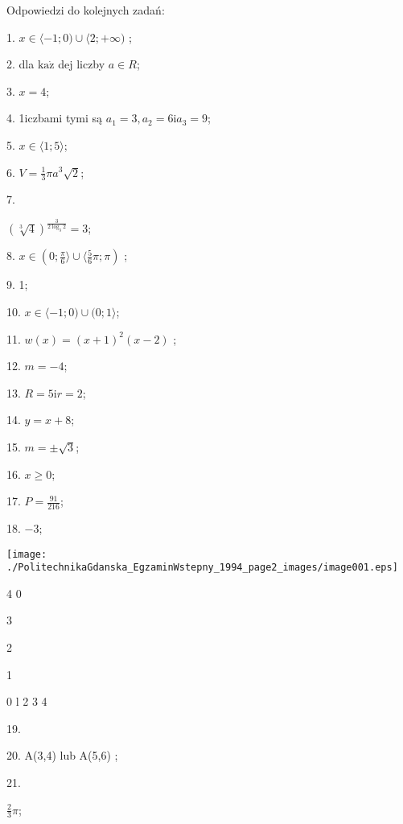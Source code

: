 \documentclass[a4paper,12pt]{article}
\begin{document}
Odpowiedzi do kolejnych zadań:

1. $x\in\langle-1;0)\cup\langle 2;+\infty)$ ;

2. dla $\mathrm{k}\mathrm{a}\dot{\mathrm{z}}$ dej liczby $a\in R$;

3. $x=4$;

4. 1iczbami tymi są $a_{1}=3, a_{2}=6\mathrm{i}a_{3}=9$;

5. $ x\in\langle 1;5\rangle$;

6. $V=\displaystyle \frac{1}{3}\pi a^{3}\sqrt{2}$;

7.

$(\sqrt[3]{4})^{\frac{3}{2\log_{3}2}}=3$;

8. $x\displaystyle \in(0;\frac{\pi}{6}\rangle\cup\langle\frac{5}{6}\pi;\pi)$ ;

9. 1;

10. $ x\in\langle-1;0)\cup(0;1\rangle$;

11. $w(x)=(x+1)^{2}(x-2)$ ;

12. $m=-4$;

13. $R=5\mathrm{i}r=2$;

14. $y=x+8$;

15. $m=\pm\sqrt{3}$;

16. $x\geq 0$;

17. $P=\displaystyle \frac{91}{216}$;

18. $-3$;
\begin{center}
\texttt{[image: ./PolitechnikaGdanska\_EgzaminWstepny\_1994\_page2\_images/image001.eps]}
\end{center}
4  0

3

2

1

0 l  2 3 4

19.

20. A(3,4) lub A(5,6) ;

21.

$\displaystyle \frac{2}{3}\pi$;
\end{document}
